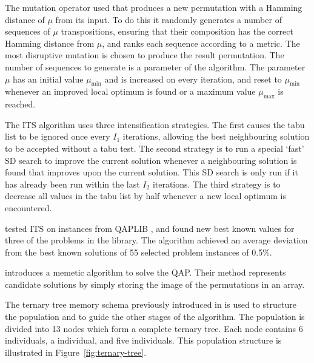 {	The mutation operator used that produces a new permutation with a Hamming distance of \(\mu\) from its input. To do this it randomly generates a number of sequences of \(\mu\) transpositions, ensuring that their composition has the correct Hamming distance from \(\mu\), and ranks each sequence according to a  metric. The most disruptive mutation is chosen to produce the result permutation.
	The number of sequences to generate is a parameter of the algorithm.
	The parameter \(\mu\) has an initial value \(\mu_\text{min}\) and is increased on every iteration, and reset to \(\mu_\text{min}\) whenever an improved local optimum is found or a maximum value \(\mu_\text{max}\) is reached.

	The ITS algorithm uses three intensification strategies.
	The first causes the tabu list to be ignored once every \(I_1\) iterations, allowing the best neighbouring solution to be accepted without a tabu test.
	The second strategy is to run a special `fast' SD search to improve the current solution whenever a neighbouring solution is found that improves upon the current solution. This SD search is only run if it has already been run within the last \(I_2\) iterations.
	The third strategy is to decrease all values in the tabu list by half whenever a new local optimum is encountered.

	\citeauthor{Misevicius:2012dj} tested ITS on instances from QAPLIB \citep{Burkard:1997ve}, and found new best known values for three of the problems in the library. The algorithm achieved an average deviation from the best known solutions of 55 selected problem instances of 0.5\%.


    \citet{Harris:2015kw} introduces a memetic algorithm to solve the QAP.
    Their method represents candidate solutions by simply storing the image of the permutations in an array.

    The ternary tree memory schema previously introduced in \citet{Inostroza:2008md} is used to structure the population and to guide the other stages of the algorithm.
    The population is divided into 13 nodes which form a complete ternary tree. Each node contains 6 individuals, a  individual, and five  individuals.
    This population structure is illustrated in Figure~\ref{fig:ternary-tree}.

}
